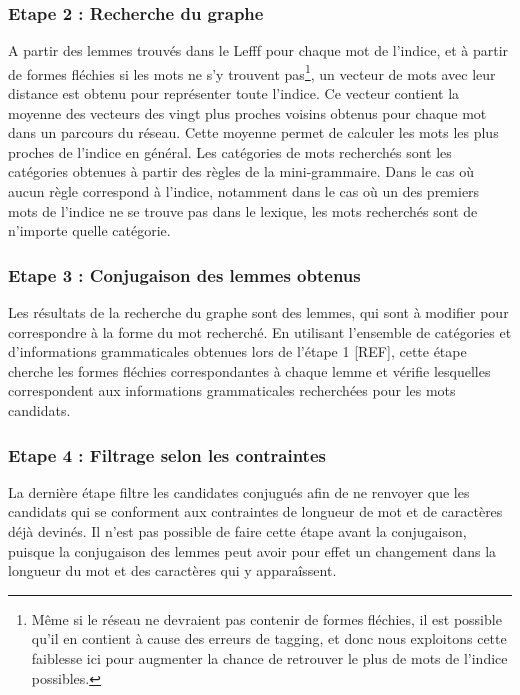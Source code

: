 \documentclass[a4paper, 12pt]{article}
\begin{document}
\subsubsection{Etape 2 : Recherche du graphe}

A partir des lemmes trouvés dans le Lefff pour chaque mot de l'indice, et à partir de formes fléchies si les mots ne s'y trouvent pas\footnote{Même si le réseau ne devraient pas contenir de formes fléchies, il est possible qu'il en contient à cause des erreurs de tagging, et donc nous exploitons cette faiblesse ici pour augmenter la chance de retrouver le plus de mots de l'indice possibles.}, un vecteur de mots avec leur distance est obtenu pour représenter toute l'indice. Ce vecteur contient la moyenne des vecteurs des vingt plus proches voisins obtenus pour chaque mot dans un parcours du réseau. Cette moyenne permet de calculer les mots les plus proches de l'indice en général. Les catégories de mots recherchés sont les catégories obtenues à partir des règles de la mini-grammaire. Dans le cas où aucun règle correspond à l'indice, notamment dans le cas où un des premiers mots de l'indice ne se trouve pas dans le lexique, les mots recherchés sont de n'importe quelle catégorie.

\subsubsection{Etape 3 : Conjugaison des lemmes obtenus}

Les résultats de la recherche du graphe sont des lemmes, qui sont à modifier pour correspondre à la forme du mot recherché. En utilisant l'ensemble de catégories et d'informations grammaticales obtenues lors de l'étape 1 [REF], cette étape cherche les formes fléchies correspondantes à chaque lemme et vérifie lesquelles correspondent aux informations grammaticales recherchées pour les mots candidats.

\subsubsection{Etape 4 : Filtrage selon les contraintes}

La dernière étape filtre les candidates conjugués afin de ne renvoyer que les candidats qui se conforment aux contraintes de longueur de mot et de caractères déjà devinés. Il n'est pas possible de faire cette étape avant la conjugaison, puisque la conjugaison des lemmes peut avoir pour effet un changement dans la longueur du mot et des caractères qui y apparaîssent.
\end{document}
